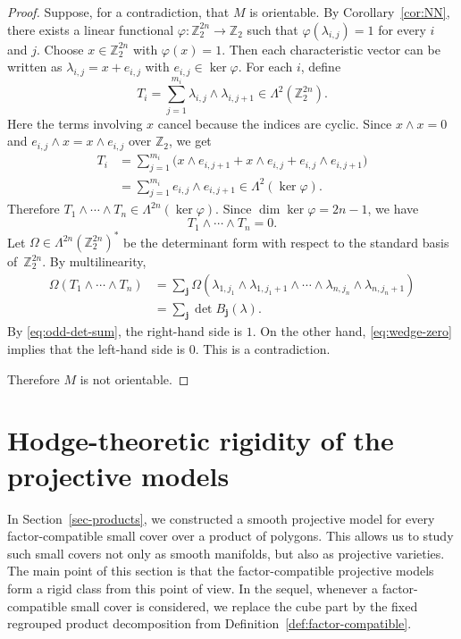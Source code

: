\documentclass{amsart}
\numberwithin{equation}{section}
\theoremstyle{definition}
\theoremstyle{remark}
\newcommand{\Z}{\mathbb Z}
\newcommand{\bj}{\mathbf j}
\begin{document}
\begin{proof}
    Suppose, for a contradiction, that $M$ is orientable.
    By Corollary~\ref{cor:NN}, there exists a linear functional $\varphi\colon \Z_2^{2n}\to \Z_2$ such that $\varphi(\lambda_{i,j})=1$ for every $i$ and $j$.
    Choose $x\in \Z_2^{2n}$ with $\varphi(x)=1$.
    Then each characteristic vector can be written as $\lambda_{i,j}=x+e_{i,j}$ with $e_{i,j}\in \ker\varphi$.
    For each $i$, define 
    $$
        T_i=\sum_{j=1}^{m_i} \lambda_{i,j}\wedge \lambda_{i,j+1} \in \Lambda^2 (\Z_2^{2n}).
    $$
    Here the terms involving $x$ cancel because the indices are cyclic.
    Since $x \wedge x = 0$ and $e_{i,j} \wedge x = x \wedge e_{i,j}$ over $\Z_2$, we get
    \begin{align*}
        T_i &=\sum_{j=1}^{m_i}\bigl(x\wedge e_{i,j+1} + x\wedge e_{i,j} + e_{i,j}\wedge e_{i,j+1}\bigr)  \\
            &=\sum_{j=1}^{m_i}e_{i,j}\wedge e_{i,j+1} \in \Lambda^2(\ker\varphi).
    \end{align*}
    Therefore $T_1\wedge\cdots\wedge T_n \in \Lambda^{2n}(\ker\varphi)$.
    Since $\dim \ker \varphi=2n-1$, we have 
    \begin{equation}\label{eq:wedge-zero}
        T_1\wedge\cdots\wedge T_n=0.
    \end{equation}
    Let $\Omega\in \Lambda^{2n}(\Z_2^{2n})^\ast$ be the determinant form with respect to the standard basis of~$\Z_2^{2n}$.
    By multilinearity,
    \begin{align*}
        \Omega(T_1\wedge\cdots\wedge T_n) &= \sum_{\bj} \Omega(\lambda_{1,j_1}\wedge \lambda_{1,j_1+1} \wedge\cdots\wedge \lambda_{n,j_n}\wedge \lambda_{n,j_n+1}    ) \\
            &= \sum_{\bj}\det B_{\bj}(\lambda).
    \end{align*}
    By \eqref{eq:odd-det-sum}, the right-hand side is $1$.
    On the other hand, \eqref{eq:wedge-zero} implies that the left-hand side is $0$.
    This is a contradiction.
    
    Therefore $M$ is not orientable.
\end{proof}



\section{Hodge-theoretic rigidity of the projective models}\label{sec-hodge-mod2}

In Section~\ref{sec-products}, we constructed a smooth projective model for every factor-compatible small cover over a product of polygons.
This allows us to study such small covers not only as smooth manifolds, but also as projective varieties.
The main point of this section is that the factor-compatible projective models form a rigid class from this point of view.
In the sequel, whenever a factor-compatible small cover is considered, we replace the cube part by the fixed regrouped product decomposition from Definition~\ref{def:factor-compatible}.
\end{document}
